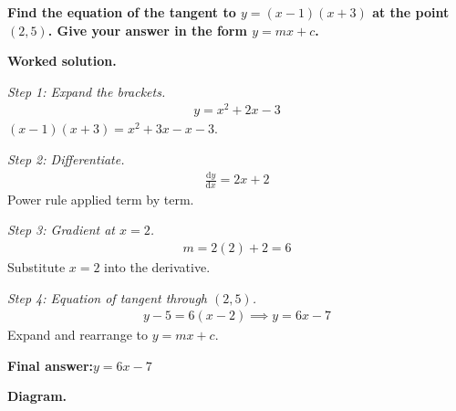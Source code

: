 \documentclass[11pt]{article}
\newcommand{\question}[1]{\par\medskip\noindent\textbf{#1}\par}
\begin{document}
\question{Find the equation of the tangent to \( y = (x-1)(x+3) \) at the point \( (2, 5) \). Give your answer in the form \( y = mx + c \).}

\textbf{Worked solution.}

\textit{Step 1: Expand the brackets.}
\[\begin{gathered}
y = x^2 + 2x - 3
\end{gathered}\]
\( (x-1)(x+3) = x^2 + 3x - x - 3 \).

\textit{Step 2: Differentiate.}
\[\begin{gathered}
\frac{\mathrm{d}y}{\mathrm{d}x} = 2x + 2
\end{gathered}\]
Power rule applied term by term.

\textit{Step 3: Gradient at \( x = 2 \).}
\[\begin{gathered}
m = 2(2) + 2 = 6
\end{gathered}\]
Substitute \( x = 2 \) into the derivative.

\textit{Step 4: Equation of tangent through \( (2, 5) \).}
\[\begin{gathered}
y - 5 = 6(x - 2) \implies y = 6x - 7
\end{gathered}\]
Expand and rearrange to \( y = mx + c \).

\begin{answerbox}
\textbf{Final answer:}\quad \(\displaystyle  y = 6x - 7 \)
\end{answerbox}
\textbf{Diagram.}
\end{document}
